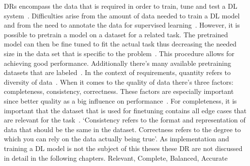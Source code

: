 \acp{DR} encompass the data that is required in order to train, tune and test a \ac{DL}
system~\cite{vogelsang_requirements_2019}.
Difficulties arise from the amount of data needed to train a \ac{DL} model and from the need to
annotate the data for supervised learning~\cite{nowruzi_how_2019}.
However, it is possible to pretrain a model on a dataset for a related task.
The pretrained model can then be fine tuned to fit the actual task thus decreasing the needed size
in the data set that is specific to the problem~\cite{ouyang_factors_2016}.
This procedure allows for achieving good performance.
Additionally there's many available pretraining datasets that are labeled~\cite{ouyang_factors_2016}.
In the context of requirements, quantity refers to diversity of data~\cite{vogelsang_requirements_2019}.
When it comes to the quality of data there's three factors: completeness, consistency,
correctness.
These factors are especially important since better quality as a big influence on
performance~\cite{vogelsang_requirements_2019}.
For completeness, it is important that the dataset that is used for finetuning contains all edge
cases that are relevant for the task~\cite{arpteg_software_2018, vogelsang_requirements_2019}.
`Consistency refers to the format and representation of data that should be the same in the dataset. Correctness refers to the degree to which you can rely on the data actually being
true'\cite{vogelsang_requirements_2019}.
As implementation and training a \ac{DL} model is not the subject of this theses these \ac{DR} are
not discussed in detail in the following chapters.
Relevant, Complete, Balanced, Accurate~\cite{ashmore_assuring_2021}

